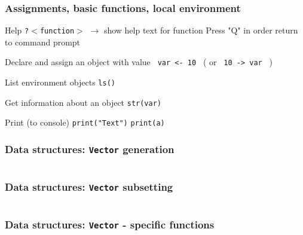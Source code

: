 \documentclass[ucs]{beamer}
\begin{document}
   \begin{frame}
    \frametitle{Assignments, basic functions, local environment}
  \begin{block}{Help}
    \texttt{?$<$function$>$} $\rightarrow$ show help text for function\newline
    Press "Q" in order return to command prompt
  \end{block}
  \begin{block}{Declare and assign an object with value}
    \texttt{ var <- 10 } ( or {\texttt{ 10 -> var }} )
  \end{block}
  \begin{block}{List environment objects}
  \texttt{ls()}
  \end{block}
  \begin{block}{Get information about an object}
  \texttt{str(var)}
  \end{block}
  \begin{block}{Print (to console)}
  \texttt{print("Text")}
    \texttt{print(a)}
  \end{block}
 \end{frame}  
\begin{frame}
        \frametitle{Data structures: \texttt{Vector} generation}
  \begin{columns}[T]
      \begin{column}{0.5\textwidth}
      \end{column}
      \begin{column}{0.5\textwidth}
      \end{column}
\end{columns}
  \end{frame}

\begin{frame}
  \frametitle{Data structures: \texttt{Vector} subsetting}
  \begin{columns}[T]
    \begin{column}{0.5\textwidth}
    \end{column}
    \begin{column}{0.5\textwidth}
    \end{column}
  \end{columns}
\end{frame}

\begin{frame}
  \frametitle{Data structures: \texttt{Vector} - specific functions}
  \begin{columns}[T]
    \begin{column}{0.5\textwidth}
    \end{column}
    \begin{column}{0.5\textwidth}
    \end{column}
  \end{columns}
\end{frame}
\end{document}
